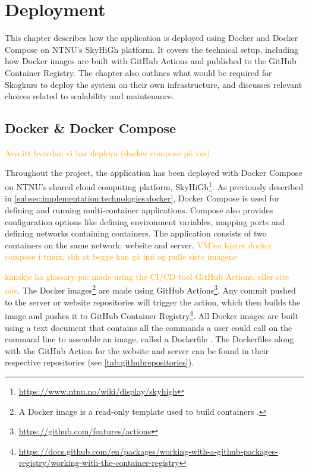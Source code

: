 \chapter{Deployment}\label{chap:deployment}

This chapter describes how the application is deployed using Docker and Docker Compose on NTNU's SkyHiGh platform. It covers the technical setup, including how Docker images are built with GitHub Actions and published to the GitHub Container Registry. The chapter also outlines what would be required for Skogkurs to deploy the system on their own infrastructure, and discusses relevant choices related to scalability and maintenance.

\section{Docker \& Docker Compose}

\textcolor{orange}{Avsnitt hvordan vi har deploya (docker compose på vm)}

Throughout the project, the application has been deployed with Docker Compose on NTNU's shared cloud computing platform, SkyHiGh\footnote{\url{https://www.ntnu.no/wiki/display/skyhigh}}. As previously described in \autoref{subsec:implementation:technologies:docker}, Docker Compose is used for defining and running multi-container applications. Compose also provides configuration options like defining environment variables, mapping ports and defining networks containing containers. The application consists of two containers on the same network: website and server. \textcolor{orange}{VM'en kjører docker compose i tmux, slik at begge kan gå inn og pulle siste imagene}

\textcolor{orange}{kanskje ha glossary på: made using the CI/CD tool GitHub Actions, eller cite noe}.
The Docker images\footnote{A Docker image is a read-only template used to build containers \cite{dockerwikipedia}.} are made using GitHub Actions\footnote{\url{https://github.com/features/actions}}. Any commit pushed to the server or website repositories will trigger the action, which then builds the image and pushes it to GitHub Container Registry\footnote{\url{https://docs.github.com/en/packages/working-with-a-github-packages-registry/working-with-the-container-registry}}. All Docker images are built using a text document that contains all the commands a user could call on the command line to assemble an image, called a Dockerfile \cite{dockerfiledocs}. The Dockerfiles along with the GitHub Action for the website and server can be found in their respective repositories (see \autoref{tab:githubrepositories}).

